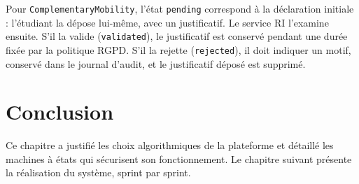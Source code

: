 Pour \texttt{ComplementaryMobility}, l'état \texttt{pending} correspond à la déclaration initiale : l'étudiant la dépose lui-même, avec un justificatif. Le service RI l'examine ensuite. S'il la valide (\texttt{validated}), le justificatif est conservé pendant une durée fixée par la politique RGPD. S'il la rejette (\texttt{rejected}), il doit indiquer un motif, conservé dans le journal d'audit, et le justificatif déposé est supprimé.

\section*{Conclusion}
\justifying
{}
{}

Ce chapitre a justifié les choix algorithmiques de la plateforme et détaillé les machines à états qui sécurisent son fonctionnement. Le chapitre suivant présente la réalisation du système, sprint par sprint.
